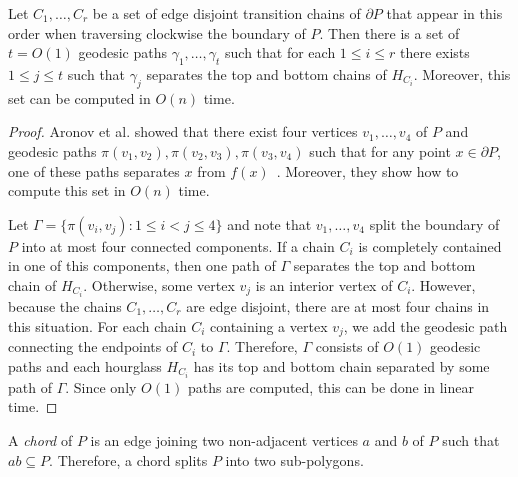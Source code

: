 \documentclass[a4paper,UKenglish]{lipics}
\newcommand{\ff}[1]{\ensuremath{f(#1)}}
\newcommand{\p}[2]{\ensuremath{\pi(#1, #2)}}
\begin{document}
\begin{lemma}\label{lemma:Split paths}
Let $C_1, \ldots, C_r$ be a set of edge disjoint transition chains of $\partial P$ that appear in this order when traversing clockwise the boundary of $P$. Then there is a set of $t = O(1)$ geodesic paths $\gamma_1, \ldots, \gamma_t$ such that for each $1\leq i\leq r$ there exists $1\leq j\leq t$ such that $\gamma_j$ separates the top and bottom chains of $H_{C_i}$.
Moreover, this set can be computed in $O(n)$ time.
\end{lemma}
\begin{proof}
Aronov et al. showed that there exist four vertices $v_1, \ldots, v_4$ of $P$ and geodesic paths $\p{v_1}{v_2}, \p{v_2}{v_3}, \p{v_3}{v_4}$ such that for any point $x\in \partial P$, one of these paths separates $x$ from $\ff{x}$~\cite[Lemma 2.7.6]{aronov1993furthest}. Moreover, they show how to compute this set in $O(n)$ time.

Let $\Gamma= \{\p{v_i}{v_j} : 1\leq i < j\leq 4\}$ and note that $v_1, \ldots, v_4$ split the boundary of $P$ into at most four connected components.
If a chain $C_i$ is completely contained in one of this components, then one path of $\Gamma$ separates the top and bottom chain of $H_{C_i}$. Otherwise, some vertex $v_j$ is an interior vertex of $C_i$. However, because the chains $C_1, \ldots, C_r$ are edge disjoint, there are at most four chains in this situation. 
For each chain $C_i$ containing a vertex $v_j$, we add the geodesic path connecting the endpoints of $C_i$ to $\Gamma$.
Therefore, $\Gamma$ consists of $O(1)$ geodesic paths and each hourglass $H_{C_i}$ has its top and bottom chain separated by some path of $\Gamma$.
Since only $O(1)$ paths are computed, this can be done in linear time.
\end{proof}

A \emph{chord} of $P$ is an edge joining two non-adjacent vertices $a$ and $b$ of $P$ such that $ab\subseteq P$. Therefore, a chord splits $P$ into two sub-polygons.
\end{document}
